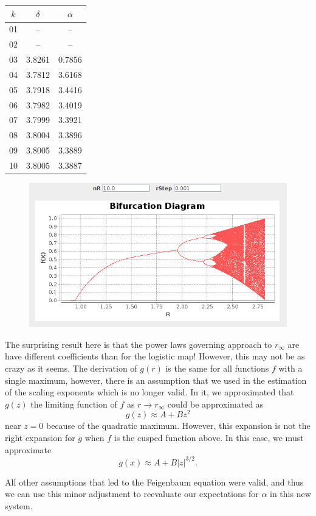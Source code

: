 \documentclass[aps,letterpaper,10pt]{article}
\begin{document}
\begin{center}
\begin{tabular}{|c|c|c|}
\hline
$k$&$\delta$&$\alpha$\\
\hline
01&--&--\\
02&--&--\\
03&3.8261&0.7856\\
04&3.7812&3.6168\\
05&3.7918&3.4416\\
06&3.7982&3.4019\\
07&3.7999&3.3921\\
08&3.8004&3.3896\\
09&3.8005&3.3889\\
10&3.8005&3.3887\\
\hline
\end{tabular}
\begin{figure}[!h]
\centering
\includegraphics[width=.8\textwidth]{IterMap3.png}
\end{figure}
\end{center}


The surprising result here is that the power laws governing approach to $r_\infty$ are have different coefficients than for the logistic map! However, this may not be as crazy as it seems. The derivation of $g(r)$ is the same for all functions $f$ with a single maximum, however, there is an assumption that we used in the estimation of the scaling exponents which is no longer valid. In it, we approximated that $g(z)$ the limiting function of $f$ as $r\to r_\infty$ could be approximated as $$g(z)\approx A + Bz^2$$ near $z=0$ because of the quadratic maximum. However, this expansion is not the right expansion for $g$ when $f$ is the cusped function above. In this case, we must approximate $$g(x)\approx A + B|z|^{3/2}.$$

All other assumptions that led to the Feigenbaum equation were valid, and thus we can use this minor adjustment to reevaluate our expectations for $\alpha$ in this new system.
\end{document}
